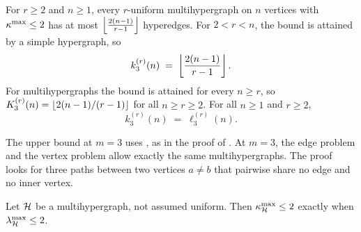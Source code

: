 \begin{theorem}[Hypergraph vertex value at $m = 3$]\label{thm:hyper-vertex-m3}
For $r \ge 2$ and $n\ge1$, every $r$-uniform multihypergraph on $n$ vertices with
$\kappa^{\max} \le 2$ has at most $\left\lfloor \frac{2(n-1)}{r-1} \right\rfloor$ hyperedges. For
$2 < r < n$, the bound
is attained by a simple hypergraph, so
\[
    k_3^{(r)}(n) \;=\; \left\lfloor \frac{2(n-1)}{r-1} \right\rfloor.
\]
For multihypergraphs the bound is attained for every $n \ge r$, so
$K_3^{(r)}(n) = \left\lfloor 2(n-1)/(r-1) \right\rfloor$ for all $n \ge r \ge 2$.
For all $n \ge 1$ and $r \ge 2$,
\[
    k_3^{(r)}(n) \;=\; \ell_3^{(r)}(n).
\]
\end{theorem}

The upper bound at $m=3$ uses , as in the proof of .
At $m=3$, the edge problem and the vertex problem allow exactly the same multihypergraphs.
The proof looks for three paths between two vertices $a \ne b$ that pairwise share no edge and no inner vertex.

\begin{lemma}[Edge and vertex conditions at $m=3$]\label{lem:theta}
Let $\mathcal{H}$ be a multihypergraph, not assumed uniform. Then $\kappa^{\max}_{\mathcal{H}} \le 2$ exactly when $\lambda^{\max}_{\mathcal{H}} \le 2$.
\end{lemma}

